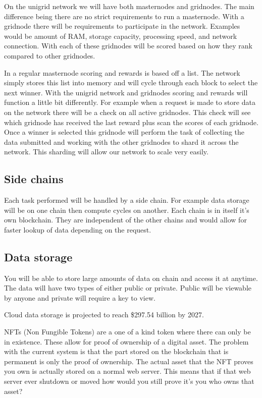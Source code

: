 \documentclass[12pt]{article}
\begin{document}
On the unigrid network we will have both masternodes and gridnodes. The main difference being there are no strict requirements to run a masternode. With a gridnode there will be requirements to participate in the network. Examples would be amount of RAM, storage capacity, processing speed, and network connection. With each of these gridnodes will be scored based on how they rank compared to other gridnodes.

In a regular masternode scoring and rewards is based off a list. The network simply stores this list into memory and will cycle through each block to select the next winner. With the unigrid network and gridnodes scoring and rewards will function a little bit differently. For example when a request is made to store data on the network there will be a check on all active gridnodes. This check will see which gridnode has received the last reward plus scan the scores of each gridnode. Once a winner is selected this gridnode will perform the task of collecting the data submitted and working with the other gridnodes to shard it across the network. This sharding will allow our network to scale very easily.


\subsection*{Side chains}
Each task performed will be handled by a side chain. For example data storage will be on one chain then compute cycles on another. Each chain is in itself it's own blockchain. They are independent of the other chains and would allow for faster lookup of data depending on the request. 

\subsection*{Data storage}
You will be able to store large amounts of data on chain and access it at anytime. The data will have two types of either public or private. Public will be viewable by anyone and private will require a key to view.

Cloud data storage is projected to reach \$297.54 billion by 2027\cite{fort2021}.

NFTs (Non Fungible Tokens) are a one of a kind token where there can only be in existence. These allow for proof of ownership of a digital asset. The problem with the current system is that the part stored on the blockchain that is permanent is only the proof of ownership. The actual asset that the NFT proves you own is actually stored on a normal web server. This means that if that web server ever shutdown or moved how would you still prove it's you who owns that asset?
\end{document}
